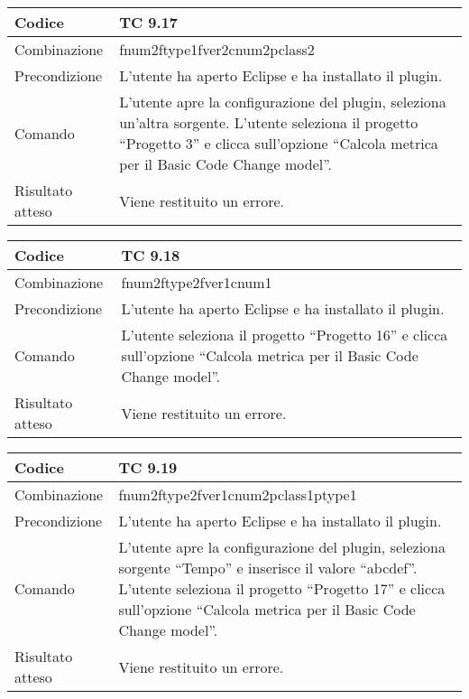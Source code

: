 \begin{table}[ht]
\begin{tabular}{|p{3cm}|p{9cm}|}
\hline
\cellcolor{lightgray}Codice				& TC 9.17								\\
\hline
\cellcolor{lightgray}Combinazione		& fnum2ftype1fver2cnum2pclass2									\\
\hline
\cellcolor{lightgray}Precondizione		& L'utente ha aperto Eclipse e ha installato il plugin.		\\
\hline
\cellcolor{lightgray}Comando			& L'utente apre la configurazione del plugin, seleziona un'altra sorgente. L'utente seleziona il progetto ``Progetto 3''  e clicca sull'opzione ``Calcola metrica per il Basic Code Change model''.	\\
\hline
\cellcolor{lightgray}Risultato atteso	& Viene restituito un errore.\\
\hline
\end{tabular}
\end{table}

\begin{table}[ht]
\begin{tabular}{|p{3cm}|p{9cm}|}
\hline
\cellcolor{lightgray}Codice				& TC 9.18								\\
\hline
\cellcolor{lightgray}Combinazione		& fnum2ftype2fver1cnum1									\\
\hline
\cellcolor{lightgray}Precondizione		& L'utente ha aperto Eclipse e ha installato il plugin.		\\
\hline
\cellcolor{lightgray}Comando			& L'utente seleziona il progetto ``Progetto 16''  e clicca sull'opzione ``Calcola metrica per il Basic Code Change model''.	\\
\hline
\cellcolor{lightgray}Risultato atteso	& Viene restituito un errore.\\
\hline
\end{tabular}
\end{table}

\clearpage

\begin{table}[ht]
\begin{tabular}{|p{3cm}|p{9cm}|}
\hline
\cellcolor{lightgray}Codice				& TC 9.19								\\
\hline
\cellcolor{lightgray}Combinazione		& fnum2ftype2fver1cnum2pclass1ptype1									\\
\hline
\cellcolor{lightgray}Precondizione		& L'utente ha aperto Eclipse e ha installato il plugin.		\\
\hline
\cellcolor{lightgray}Comando			& L'utente apre la configurazione del plugin, seleziona sorgente ``Tempo'' e inserisce il valore ``abcdef''. L'utente seleziona il progetto ``Progetto 17''  e clicca sull'opzione ``Calcola metrica per il Basic Code Change model''.	\\
\hline
\cellcolor{lightgray}Risultato atteso	& Viene restituito un errore.\\
\hline
\end{tabular}
\end{table}

